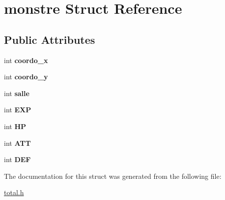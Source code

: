 \hypertarget{structmonstre}{}\section{monstre Struct Reference}
\label{structmonstre}
\subsection*{Public Attributes}
\begin{DoxyCompactItemize}
\item 
int {\bfseries coordo\+\_\+x}\hypertarget{structmonstre_a24a83b84ee31de0ae1039c35e727edb3}{}\label{structmonstre_a24a83b84ee31de0ae1039c35e727edb3}

\item 
int {\bfseries coordo\+\_\+y}\hypertarget{structmonstre_aff884ac740f3d4ad72c9cc168c7c69ff}{}\label{structmonstre_aff884ac740f3d4ad72c9cc168c7c69ff}

\item 
int {\bfseries salle}\hypertarget{structmonstre_abbdb5a7232afbe56e22f353449adb231}{}\label{structmonstre_abbdb5a7232afbe56e22f353449adb231}

\item 
int {\bfseries E\+XP}\hypertarget{structmonstre_ac6f05fe9ebf55360ec05093d0396c3c0}{}\label{structmonstre_ac6f05fe9ebf55360ec05093d0396c3c0}

\item 
int {\bfseries HP}\hypertarget{structmonstre_a1d9e694da03b99b42d37a235aa0d192a}{}\label{structmonstre_a1d9e694da03b99b42d37a235aa0d192a}

\item 
int {\bfseries A\+TT}\hypertarget{structmonstre_ac5f0d856f757ebba81a4a9dbf9bf5f75}{}\label{structmonstre_ac5f0d856f757ebba81a4a9dbf9bf5f75}

\item 
int {\bfseries D\+EF}\hypertarget{structmonstre_afcf3f27812f06ead6b281de41937440c}{}\label{structmonstre_afcf3f27812f06ead6b281de41937440c}

\end{DoxyCompactItemize}


The documentation for this struct was generated from the following file\+:\begin{DoxyCompactItemize}
\item 
\hyperlink{total_8h}{total.\+h}\end{DoxyCompactItemize}
